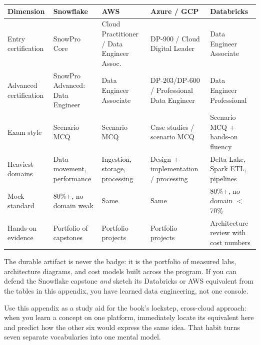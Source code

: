 \begin{center}
\footnotesize
\begin{tabular}{@{}p{2.5cm}p{2.9cm}p{2.7cm}p{2.9cm}p{2.9cm}@{}}
\toprule
\textbf{Dimension} & \textbf{Snowflake} & \textbf{AWS} & \textbf{Azure / GCP} & \textbf{Databricks} \\
\midrule
Entry certification & SnowPro Core & Cloud Practitioner / Data Engineer Assoc. & DP-900 / Cloud Digital Leader & Data Engineer Associate \\
Advanced certification & SnowPro Advanced: Data Engineer & Data Engineer Associate & DP-203/DP-600 / Professional Data Engineer & Data Engineer Professional \\
Exam style & Scenario MCQ & Scenario MCQ & Case studies / scenario MCQ & Scenario MCQ + hands-on fluency \\
Heaviest domains & Data movement, performance & Ingestion, storage, processing & Design + implementation / processing & Delta Lake, Spark ETL, pipelines \\
Mock standard & 80\%+, no domain weak & Same & Same & 80\%+, no domain $<$70\% \\
Hands-on evidence & Portfolio of capstones & Portfolio projects & Portfolio projects & Architecture review with cost numbers \\
\bottomrule
\end{tabular}
\end{center}

\noindent The durable artifact is never the badge: it is the portfolio of measured labs,
architecture diagrams, and cost models built across the program. If you can defend the
Snowflake capstone \emph{and} sketch its Databricks or AWS equivalent from the tables in this
appendix, you have learned data engineering, not one console.

\begin{tipbox}
Use this appendix as a study aid for the book's lockstep, cross-cloud approach: when you learn a
concept on one platform, immediately locate its equivalent here and predict how the other six
would express the same idea. That habit turns seven separate vocabularies into one mental model.
\end{tipbox}
